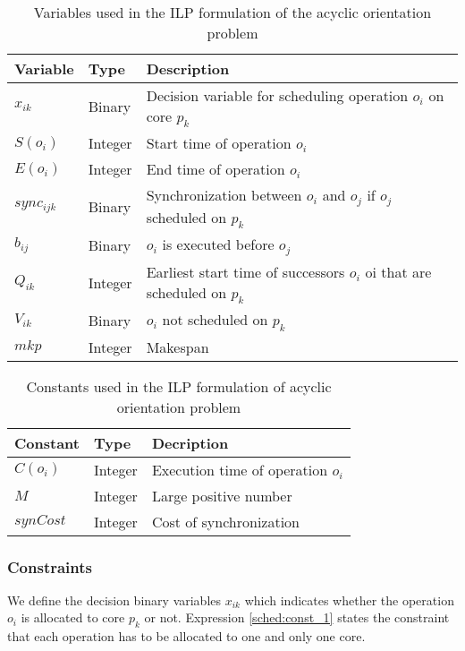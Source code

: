 \begin{table}[!htbp]
\caption{Variables used in the ILP formulation of the acyclic orientation problem}
\centering
\label{tab:varilpsched}
\begin{tabular}{l l l}
\toprule
Variable & Type & Description  \\
\midrule
 $x_{ik}$ & Binary & Decision variable for scheduling operation $o_i$ on core $p_k$\\
 $S(o_i)$ & Integer & Start time of operation $o_i$\\
 $E(o_i)$ & Integer & End time of operation $o_i$\\
 $sync_{ijk}$ & Binary & Synchronization between $o_i$ and $o_j$ if $o_j$ scheduled on $p_k$ \\
 $b_{ij}$ & Binary & $o_i$ is executed before $o_j$\\
 $Q_{ik}$ & Integer & Earliest start time of successors $o_i$ oi that are scheduled on $p_k$\\
 $V_{ik}$ & Binary & $o_i$ not scheduled on $p_k$\\
 $mkp$ & Integer & Makespan\\
\bottomrule
\end{tabular}
\end{table}

\begin{table}[!htbp]
\caption{Constants used in the ILP formulation of acyclic orientation problem}
\centering
\label{tab:consilpsched}
\begin{tabular}{l l l}
\toprule
Constant & Type & Decription\\
\midrule
 $C(o_i)$ & Integer & Execution time of operation $o_i$\\
 $M$ & Integer & Large positive number\\
 $synCost$ & Integer & Cost of synchronization\\
\bottomrule
\end{tabular}
\end{table}

\subsubsection{Constraints}

We define the decision binary variables $x_{ik}$ which indicates whether the operation $o_i$ is allocated to core $p_k$ or not. Expression \ref{sched:const_1} states the constraint that each operation has to be allocated to one and only one core.

